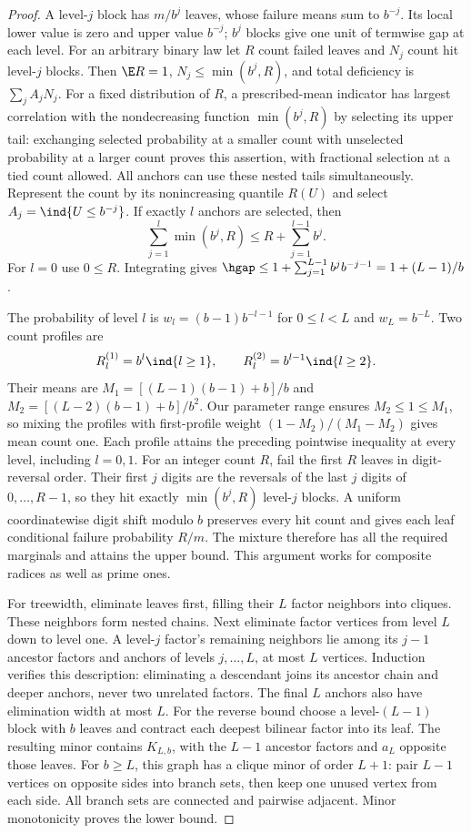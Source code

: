 \begin{proof}
A level-$j$ block has $m/b^j$ leaves, whose failure means sum to $b^{-j}$.
Its local lower value is zero and upper value $b^{-j}$; $b^j$ blocks give
one unit of termwise gap at each level. For an arbitrary binary law let
$R$ count failed leaves and $N_j$ count hit level-$j$ blocks. Then
$\E R=1$, $N_j\le\min(b^j,R)$, and total deficiency is
$\sum_j A_jN_j$. For a fixed distribution of $R$, a prescribed-mean
indicator has largest correlation with the nondecreasing function
$\min(b^j,R)$ by selecting its upper tail: exchanging selected probability
at a smaller count with unselected probability at a larger count proves
this assertion, with fractional selection at a tied count allowed. All
anchors can use these nested tails simultaneously. Represent the count by
its nonincreasing quantile $R(U)$ and select $A_j=\ind\{U\le b^{-j}\}$.
If exactly $l$ anchors are selected, then
\[
 \sum_{j=1}^l\min(b^j,R)\le R+\sum_{j=1}^{l-1}b^j.
\]
For $l=0$ use $0\le R$. Integrating gives
$\hgap\le1+\sum_{j=1}^{L-1}b^j b^{-j-1}=1+(L-1)/b$.

The probability of level $l$ is $w_l=(b-1)b^{-l-1}$ for $0\le l<L$
and $w_L=b^{-L}$. Two count profiles are
\[
 R_l^{(1)}=b^l\ind\{l\ge1\},\qquad
 R_l^{(2)}=b^{l-1}\ind\{l\ge2\}.
\]
Their means are $M_1=[(L-1)(b-1)+b]/b$ and
$M_2=[(L-2)(b-1)+b]/b^2$. Our parameter range ensures
$M_2\le1\le M_1$, so mixing the profiles with first-profile weight
$(1-M_2)/(M_1-M_2)$ gives mean count one. Each profile attains the
preceding pointwise inequality at every level, including $l=0,1$.
For an integer count $R$, fail the first $R$ leaves in digit-reversal
order. Their first $j$ digits are the reversals of the last $j$ digits of
$0,\ldots,R-1$, so they hit exactly $\min(b^j,R)$ level-$j$ blocks.
A uniform coordinatewise digit shift modulo $b$ preserves every hit count
and gives each leaf conditional failure probability $R/m$. The mixture
therefore has all the required marginals and attains the upper bound.
This argument works for composite radices as well as prime ones.

For treewidth, eliminate leaves first, filling their $L$ factor neighbors
into cliques. These neighbors form nested chains. Next eliminate factor
vertices from level $L$ down to level one. A level-$j$ factor's remaining
neighbors lie among its $j-1$ ancestor factors and anchors of levels
$j,\ldots,L$, at most $L$ vertices. Induction verifies this description:
eliminating a descendant joins its ancestor chain and deeper anchors,
never two unrelated factors. The final $L$ anchors also have elimination
width at most $L$. For the reverse bound choose a level-$(L-1)$ block
with $b$ leaves and contract each deepest bilinear factor into its leaf.
The resulting minor contains $K_{L,b}$, with the $L-1$ ancestor factors
and $a_L$ opposite those leaves. For $b\ge L$, this graph has a clique
minor of order $L+1$: pair $L-1$ vertices on opposite sides into branch
sets, then keep one unused vertex from each side. All branch sets are
connected and pairwise adjacent. Minor monotonicity proves the lower bound.
\end{proof}

